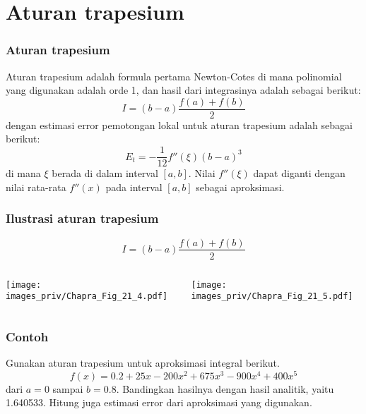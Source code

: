 \section{Aturan trapesium}

\begin{frame}
\frametitle{Aturan trapesium}

Aturan trapesium adalah formula pertama Newton-Cotes di mana polinomial yang digunakan
adalah orde 1, dan hasil dari integrasinya adalah sebagai berikut:
\begin{equation*}
I = (b - a) \frac{f(a) + f(b)}{2}
\end{equation*}
dengan estimasi error pemotongan lokal untuk aturan trapesium adalah sebagai berikut:
\begin{equation*}
E_{t} = -\frac{1}{12} f''(\xi) (b - a)^3
\end{equation*}
di mana $\xi$ berada di dalam interval $[a,b]$. Nilai $f''(\xi)$ dapat diganti dengan nilai
rata-rata $f''(x)$ pada interval $[a,b]$ sebagai aproksimasi.

\end{frame}

\begin{frame}
\frametitle{Ilustrasi aturan trapesium}

\begin{equation*}
I = (b - a) \frac{f(a) + f(b)}{2}
\end{equation*}
    

\begin{columns}

\begin{column}{0.5\textwidth}
{\centering
\texttt{[image: images\_priv/Chapra\_Fig\_21\_4.pdf]}
\par}    
\end{column}

\begin{column}{0.5\textwidth}
{\centering
\texttt{[image: images\_priv/Chapra\_Fig\_21\_5.pdf]}
\par}    
\end{column}

\end{columns}

\end{frame}


\begin{frame}
\frametitle{Contoh}

Gunakan aturan trapesium untuk aproksimasi integral berikut.
\begin{equation*}
f(x) = 0.2 + 25x - 200x^2 + 675x^3 - 900x^4 + 400x^5
\end{equation*}
dari $a = 0$ sampai $b = 0.8$. Bandingkan hasilnya dengan hasil analitik,
yaitu 1.640533. Hitung juga estimasi error dari aproksimasi yang digunakan.

\end{frame}


